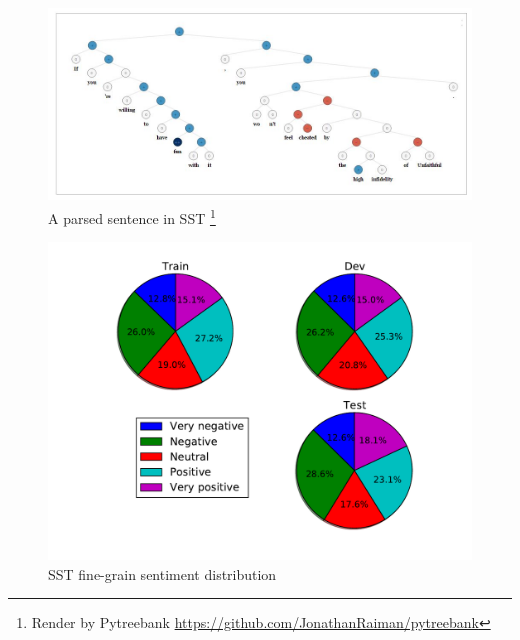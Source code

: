 \begin{figure}[H]
	\begin{minipage}{\textwidth}
		\centering
		\includegraphics[width=0.9\linewidth]{figure/sst}
		\caption[A parsed sentence in SST]{A parsed sentence in SST \footnote{Render by Pytreebank \url{https://github.com/JonathanRaiman/pytreebank}}}
		\label{fig:sst}
	\end{minipage}
\end{figure}

\begin{figure}[H]
	\begin{minipage}{\textwidth}
		\centering
		\includegraphics[width=0.9\linewidth]{figure/sstfinegrain}
		\caption[SST fine-grain sentiment distribution]{SST fine-grain sentiment distribution}
		\label{fig:sstfinegrain}
	\end{minipage}
\end{figure}

